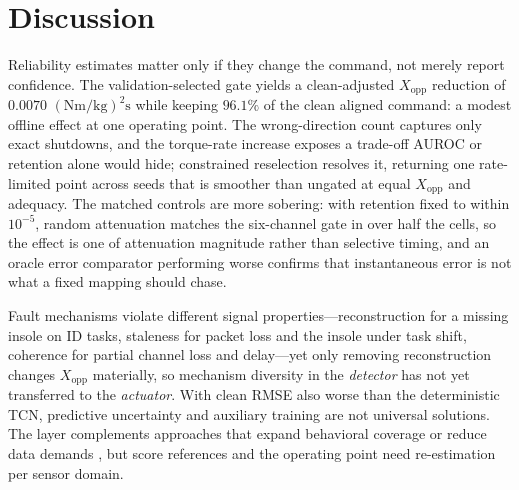 \documentclass[letterpaper]{article} %
\begin{document}
\section{Discussion}
Reliability estimates matter only if they change the command, not merely report confidence. The validation-selected gate yields a clean-adjusted $X_{\mathrm{opp}}$ reduction of $0.0070$ $(\mathrm{Nm/kg})^2\mathrm{s}$ while keeping $96.1\%$ of the clean aligned command: a modest offline effect at one operating point.
The wrong-direction count captures only exact shutdowns, and the torque-rate increase exposes a trade-off AUROC or retention alone would hide; constrained reselection resolves it, returning one rate-limited point across seeds that is smoother than ungated at equal $X_{\mathrm{opp}}$ and adequacy. The matched controls are more sobering: with retention fixed to within $10^{-5}$, random attenuation matches the six-channel gate in over half the cells, so the effect is one of attenuation magnitude rather than selective timing, and an oracle error comparator performing worse confirms that instantaneous error is not what a fixed mapping should chase.

Fault mechanisms violate different signal properties---reconstruction for a missing insole on ID tasks, staleness for packet loss and the insole under task shift, coherence for partial channel loss and delay---yet only removing reconstruction changes $X_{\mathrm{opp}}$ materially, so mechanism diversity in the \emph{detector} has not yet transferred to the \emph{actuator}. With clean RMSE also worse than the deterministic TCN, predictive uncertainty and auxiliary training are not universal solutions. The layer complements approaches that expand behavioral coverage \citep{molinaro2024task} or reduce data demands \citep{scherpereel2025domain}, but score references and the operating point need re-estimation per sensor domain.
\end{document}
